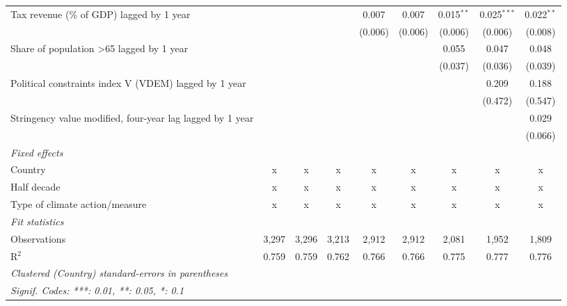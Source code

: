 \begin{tabular}{lcccccccc}
   Tax revenue (\% of GDP) lagged by 1 year                  &         &         &         & 0.007   & 0.007   & 0.015$^{**}$ & 0.025$^{***}$ & 0.022$^{**}$\\   
                                                             &         &         &         & (0.006) & (0.006) & (0.006)      & (0.006)       & (0.008)\\   
   Share of population >65 lagged by 1 year                  &         &         &         &         &         & 0.055        & 0.047         & 0.048\\   
                                                             &         &         &         &         &         & (0.037)      & (0.036)       & (0.039)\\   
   Political constraints index V (VDEM) lagged by 1 year     &         &         &         &         &         &              & 0.209         & 0.188\\   
                                                             &         &         &         &         &         &              & (0.472)       & (0.547)\\   
   Stringency value modified, four-year lag lagged by 1 year &         &         &         &         &         &              &               & 0.029\\   
                                                             &         &         &         &         &         &              &               & (0.066)\\   
   \emph{Fixed effects}\\
   Country                                                   & x       & x       & x       & x       & x       & x            & x             & x\\  
   Half decade                                               & x       & x       & x       & x       & x       & x            & x             & x\\  
   Type of climate action/measure                            & x       & x       & x       & x       & x       & x            & x             & x\\  
   \midrule \emph{Fit statistics}\\
   Observations                                              & 3,297   & 3,296   & 3,213   & 2,912   & 2,912   & 2,081        & 1,952         & 1,809\\  
   R$^2$                                                     & 0.759   & 0.759   & 0.762   & 0.766   & 0.766   & 0.775        & 0.777         & 0.776\\  
   \midrule
   \multicolumn{9}{l}{\emph{Clustered (Country) standard-errors in parentheses}}\\
   \multicolumn{9}{l}{\emph{Signif. Codes: ***: 0.01, **: 0.05, *: 0.1}}\\
\end{tabular}
\par\endgroup


